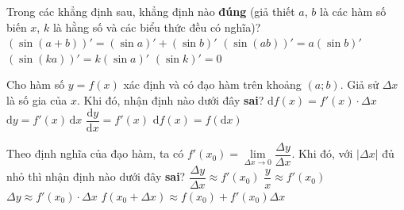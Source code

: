 \begin{ex}%
	Trong các khẳng định sau, khẳng định nào \textbf{đúng} (giả thiết $a$, $b$ là các hàm số biến $x$, $k$ là hằng số và các biểu thức đều có nghĩa)?
	\choice
	{$\left( \sin (a+b)\right) '= \left( \sin a \right) ' + \left( \sin b \right) '$}
	{$\left( \sin (ab)\right) '= a \left( \sin b \right) '$}
	{$\left( \sin (ka)\right) '= k \left( \sin a \right) ' $}
	{\True $\left( \sin k \right) ' = 0$}
\end{ex}

\begin{ex}%
	Cho hàm số $y=f(x)$ xác định và có đạo hàm trên khoảng $(a;b)$. Giả sử $\Delta x$ là số gia của $x$. Khi đó, nhận định nào dưới đây {\bf sai}?
	\choice
	{$\mathrm{d}f(x)=f'(x)\cdot \Delta x$}
	{$\mathrm{d}y=f'(x)\mathrm{\,d}x$}
	{$\dfrac{\mathrm{d}y}{\mathrm{d}x}=f'(x)$}
	{\True $\mathrm{d}f(x)=f(\mathrm{d}x)$}
\end{ex}

\begin{ex}%
	Theo định nghĩa của đạo hàm, ta có $f'(x_0)=\lim\limits_{\Delta x\rightarrow 0}\dfrac{\Delta y}{\Delta x}$. Khi đó, với $|\Delta x|$ đủ nhỏ thì nhận định nào dưới đây {\bf sai}?
	\choice
	{$\dfrac{\Delta y}{\Delta x}\approx f'(x_0)$}
	{\True $\dfrac{y}{x}\approx f'(x_0)$}
	{$\Delta y\approx f'(x_0)\cdot\Delta x$}
	{$f(x_0+\Delta x)\approx f(x_0)+f'(x_0)\Delta x$}
\end{ex}

